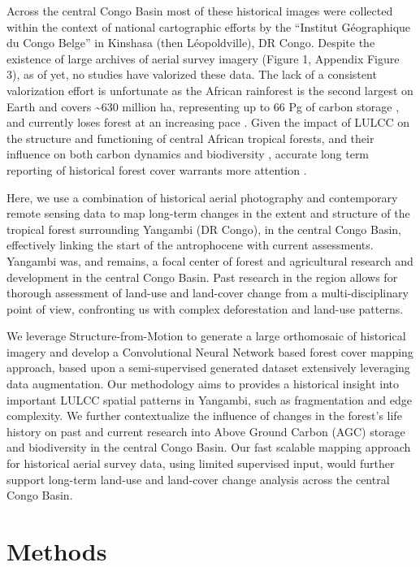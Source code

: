 \documentclass[remote sensing,article,submit,moreauthors,pdftex]{mdpi}
\begin{document}
Across the central Congo Basin most of these historical images were
collected within the context of national cartographic efforts by the
``Institut Géographique du Congo Belge'' in Kinshasa (then
Léopoldville), DR Congo. Despite the existence of large archives of
aerial survey imagery (Figure 1, Appendix Figure 3), as of yet, no
studies have valorized these data. The lack of a consistent valorization
effort is unfortunate as the African rainforest is the second largest on
Earth and covers \textasciitilde{}630 million ha, representing up to 66
Pg of carbon storage \citep{Lewis2009b}, and currently loses forest at
an increasing pace \citep{butsic2015}. Given the impact of LULCC on the
structure and functioning of central African tropical forests, and their
influence on both carbon dynamics \citep{Kearsley2013} and biodiversity
\citep{vandeperre2018}, accurate long term reporting of historical
forest cover warrants more attention \citep{willcock2016}.

Here, we use a combination of historical aerial photography and
contemporary remote sensing data to map long-term changes in the extent
and structure of the tropical forest surrounding Yangambi (DR Congo), in
the central Congo Basin, effectively linking the start of the
antrophocene \citep{lewis2015} with current assessments. Yangambi was,
and remains, a focal center of forest and agricultural research and
development in the central Congo Basin. Past research in the region
allows for thorough assessment of land-use and land-cover change from a
multi-disciplinary point of view, confronting us with complex
deforestation and land-use patterns.

We leverage Structure-from-Motion to generate a large orthomosaic of
historical imagery and develop a Convolutional Neural Network based
forest cover mapping approach, based upon a semi-supervised generated
dataset extensively leveraging data augmentation. Our methodology aims
to provides a historical insight into important LULCC spatial patterns
in Yangambi, such as fragmentation and edge complexity. We further
contextualize the influence of changes in the forest's life history on
past and current research into Above Ground Carbon (AGC) storage
\citep{Kearsley2013} and biodiversity \citep{vandeperre2018} in the
central Congo Basin. Our fast scalable mapping approach for historical
aerial survey data, using limited supervised input, would further
support long-term land-use and land-cover change analysis across the
central Congo Basin.

\hypertarget{methods}{%
\section{Methods}\label{methods}}
\end{document}
